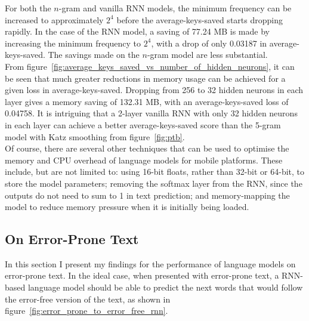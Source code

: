 \documentclass[a4paper, 12pt]{report}
\begin{document}
For both the $n$-gram and vanilla RNN models, the minimum frequency can be increased to approximately $2^4$ before the average-keys-saved starts dropping rapidly. In the case of the RNN model, a saving of 77.24 MB is made by increasing the minimum frequency to $2^4$, with a drop of only 0.03187 in average-keys-saved. The savings made on the $n$-gram model are less substantial. \\

From figure~\ref{fig:average_keys_saved_vs_number_of_hidden_neurons}, it can be seen that much greater reductions in memory usage can be achieved for a given loss in average-keys-saved. Dropping from 256 to 32 hidden neurons in each layer gives a memory saving of 132.31 MB, with an average-keys-saved loss of 0.04758. It is intriguing that a 2-layer vanilla RNN with only 32 hidden neurons in each layer can achieve a better average-keys-saved score than the 5-gram model with Katz smoothing from figure~\ref{fig:ptb}. \\

Of course, there are several other techniques that can be used to optimise the memory and CPU overhead of language models for mobile platforms. These include, but are not limited to: using 16-bit floats, rather than 32-bit or 64-bit, to store the model parameters; removing the softmax layer from the RNN, since the outputs do not need to sum to 1 in text prediction; and memory-mapping the model to reduce memory pressure when it is initially being loaded.

\subsection{On Error-Prone Text}

In this section I present my findings for the performance of language models on error-prone text. In the ideal case, when presented with error-prone text, a RNN-based language model should be able to predict the next words that would follow the error-free version of the text, as shown in figure~\ref{fig:error_prone_to_error_free_rnn}.
\end{document}
